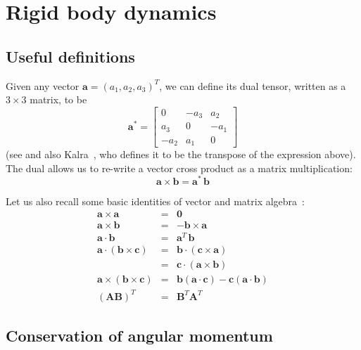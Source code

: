 \section{Rigid body dynamics\label{rigidBodyAppendix}}
\subsection{Useful definitions}

Given any vector $\mathbf{a} = (a_1, a_2, a_3)^T$, we can define its dual
tensor, written as a $3\times3$ matrix, to be
\begin{equation}
\mathbf{a}^* = \left[\begin{array}{ccc}
    0 & -a_3 & a_2 \\ a_3 & 0 & -a_1 \\ -a_2 & a_1 & 0
    \end{array}\right]
\end{equation}
(see \cite{RHB:02,BaraffWitkin:97} and also Kalra~\cite{Kalra:95}, who defines it to be
the transpose of the expression above).
The dual allows us to re-write a vector cross product as a matrix multiplication:
\begin{equation}
\mathbf{a}\times\mathbf{b} = \mathbf{a}^*\,\mathbf{b}
\end{equation}

Let us also recall some basic identities of vector and matrix algebra~\cite{RHB:02}:
\begin{eqnarray*}
\mathbf{a}\times\mathbf{a} & = & \mathbf{0} \\
\mathbf{a}\times\mathbf{b} & = & -\mathbf{b}\times\mathbf{a} \\
\mathbf{a}\cdot\mathbf{b} & = & \mathbf{a}^T\,\mathbf{b} \\
\mathbf{a}\cdot(\mathbf{b}\times\mathbf{c}) & = & \mathbf{b}\cdot(\mathbf{c}\times\mathbf{a}) \\
    & = & \mathbf{c}\cdot(\mathbf{a}\times\mathbf{b}) \\
\mathbf{a}\times(\mathbf{b}\times\mathbf{c}) & = &
    \mathbf{b}(\mathbf{a}\cdot\mathbf{c}) - \mathbf{c}(\mathbf{a}\cdot\mathbf{b}) \\
(\mathbf{A}\mathbf{B})^T & = & \mathbf{B}^T\mathbf{A}^T
\end{eqnarray*}


\subsection{Conservation of angular momentum\label{correctBrettAppendix}}


